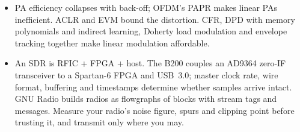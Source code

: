 \begin{itemize}
and offset tuning sidesteps DC.
\item PA efficiency collapses with back-off; OFDM's PAPR makes linear PAs inefficient. ACLR and EVM bound
the distortion. CFR, DPD with memory polynomials and indirect learning, Doherty load modulation and envelope
tracking together make linear modulation affordable.
\item An SDR is RFIC + FPGA + host. The B200 couples an AD9364 zero-IF transceiver to a Spartan-6 FPGA and
USB~3.0; master clock rate, wire format, buffering and timestamps determine whether samples arrive intact.
GNU Radio builds radios as flowgraphs of blocks with stream tags and messages. Measure your radio's noise
figure, spurs and clipping point before trusting it, and transmit only where you may.
\end{itemize}


